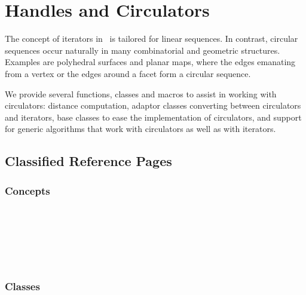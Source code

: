
\chapter{Handles and Circulators}






The concept of iterators in \stl\ is tailored for linear sequences.
In contrast, circular sequences occur naturally in many combinatorial
and geometric structures. Examples are polyhedral surfaces and planar
maps, where the edges emanating from a vertex or the edges around a
facet form a circular sequence. 

We provide several functions, classes and macros to assist in working
with circulators: distance computation, adaptor classes converting
between circulators and iterators, base classes to ease the implementation
of circulators, and support for generic algorithms that work with
circulators as well as with iterators.

\section{Classified Reference Pages}

\subsection*{Concepts}

\\
\\
\\
\\
\\

\subsection*{Classes}

